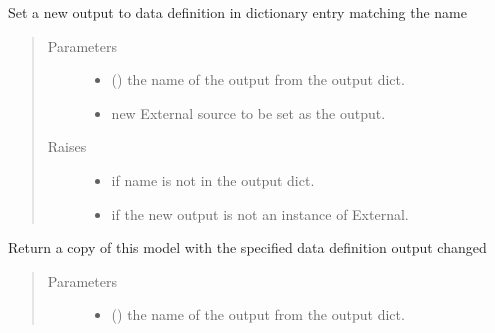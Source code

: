 \documentclass[letterpaper,10pt,english]{sphinxmanual}
\begin{document}
\begin{fulllineitems}
\begin{fulllineitems}
\label{\detokenize{dalio.application:dalio.application.application.Application.set_output}}
Set a new output to data definition in dictionary entry
matching the name
\begin{quote}\begin{description}
\item[{Parameters}] \leavevmode\begin{itemize}
\item {} 
 () \textendash{} the name of the output from the output dict.

\item {} 
 \textendash{} new External source to be set as the output.

\end{itemize}

\item[{Raises}] \leavevmode\begin{itemize}
\item {} 
 \textendash{} if name is not in the output dict.

\item {} 
 \textendash{} if the new output is not an instance of External.

\end{itemize}

\end{description}\end{quote}

\end{fulllineitems}


\begin{fulllineitems}
\label{\detokenize{dalio.application:dalio.application.application.Application.with_output}}
Return a copy of this model with the specified data definition
output changed
\begin{quote}\begin{description}
\item[{Parameters}] \leavevmode\begin{itemize}
\item {} 
 () \textendash{} the name of the output from the output dict.


\end{itemize}
\end{description}
\end{quote}
\end{fulllineitems}
\end{fulllineitems}
\end{document}
